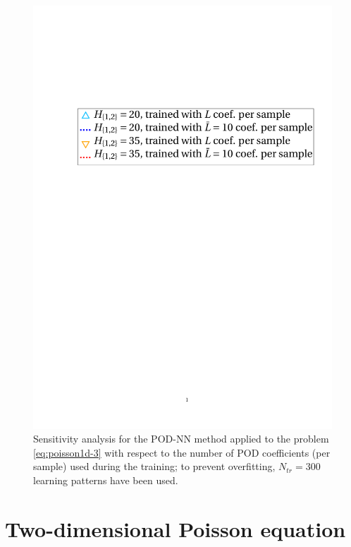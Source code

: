\documentclass[12pt, a4paper, twoside, openright]{report}
\numberwithin{equation}{chapter}
\theoremstyle{theorem}
\theoremstyle{definition}
\theoremstyle{remark}
\theoremstyle{proposition}
\numberwithin{figure}{chapter}
\begin{document}
\begin{figure}[H]
			\includegraphics[scale = 0.42, trim = {2cm 11.25cm 1cm 3cm}, clip]{poisson1d_3_nn_test_legend}
			
			\caption{Sensitivity analysis for the POD-NN method applied to the problem \eqref{eq:poisson1d-3} with respect to the number of POD coefficients (per sample) used during the training; to prevent overfitting, $N_{tr} = 300$ learning patterns have been used.}
			\label{fig:poisson1d-3-fig3}
		\end{figure}
					
	\section{Two-dimensional Poisson equation}
	\label{section:Two-dimensional Poisson equation (results)}
	
\end{document}
